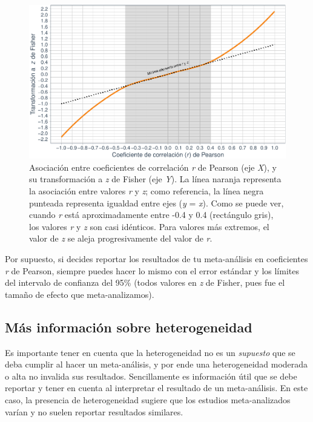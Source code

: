 \documentclass[
  bookmarksnumbered]{article}
\begin{document}
\begin{figure}
\centering
\includegraphics{Meta-analysis_files/figure-latex/rvsz-1.pdf}
\caption{\label{fig:rvsz}Asociación entre coeficientes de correlación \emph{r} de Pearson (eje \emph{X}), y su transformación a \emph{z} de Fisher (eje \emph{Y}). La línea naranja representa la asociación entre valores \emph{r} y \emph{z}; como referencia, la línea negra punteada representa igualdad entre ejes (\emph{y} = \emph{x}). Como se puede ver, cuando \emph{r} está aproximadamente entre -0.4 y 0.4 (rectángulo gris), los valores \emph{r} y \emph{z} son casi idénticos. Para valores más extremos, el valor de \emph{z} se aleja progresivamente del valor de \emph{r}.}
\end{figure}

Por supuesto, si decides reportar los resultados de tu meta-análisis en coeficientes \emph{r} de Pearson, siempre puedes hacer lo mismo con el error estándar y los límites del intervalo de confianza del 95\% (todos valores en \emph{z} de Fisher, pues fue el tamaño de efecto que meta-analizamos).

\hypertarget{muxe1s-informaciuxf3n-sobre-heterogeneidad}{%
\subsection{Más información sobre heterogeneidad}\label{muxe1s-informaciuxf3n-sobre-heterogeneidad}}

Es importante tener en cuenta que la heterogeneidad no es un \emph{supuesto} que se deba cumplir al hacer un meta-análisis, y por ende una heterogeneidad moderada o alta no invalida sus resultados. Sencillamente es información útil que se debe reportar y tener en cuenta al interpretar el resultado de un meta-análisis. En este caso, la presencia de heterogeneidad sugiere que los estudios meta-analizados varían y no suelen reportar resultados similares.
\end{document}
